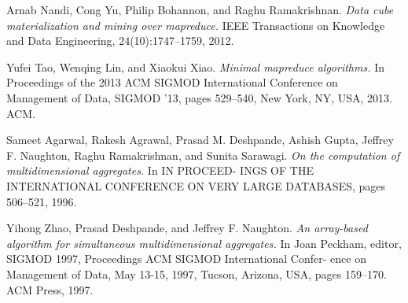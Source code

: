 \documentclass{article}
\begin{document}
\begin{thebibliography}{1}

 Arnab Nandi, Cong Yu, Philip Bohannon, and Raghu Ramakrishnan. {\em Data cube materialization and mining over mapreduce.} IEEE Transactions on Knowledge and Data Engineering, 24(10):1747–1759, 2012.

 Yufei Tao, Wenqing Lin, and Xiaokui Xiao. {\em Minimal mapreduce algorithms.} In Proceedings of the 2013 ACM SIGMOD International Conference on Management of Data, SIGMOD ’13, pages 529–540, New York, NY, USA, 2013. ACM.

 Sameet Agarwal, Rakesh Agrawal, Prasad M. Deshpande, Ashish Gupta, Jeffrey F. Naughton, Raghu Ramakrishnan, and Sunita Sarawagi. {\em On the computation of multidimensional aggregates.} In IN PROCEED- INGS OF THE INTERNATIONAL CONFERENCE ON VERY LARGE DATABASES, pages 506–521, 1996. 

 Yihong Zhao, Prasad Deshpande, and Jeffrey F. Naughton. {\em An array-based algorithm for simultaneous multidimensional aggregates. } In Joan Peckham, editor, SIGMOD 1997, Proceedings ACM SIGMOD International Confer- ence on Management of Data, May 13-15, 1997, Tucson, Arizona, USA, pages 159–170. ACM Press, 1997.

\end{thebibliography}
\end{document}
